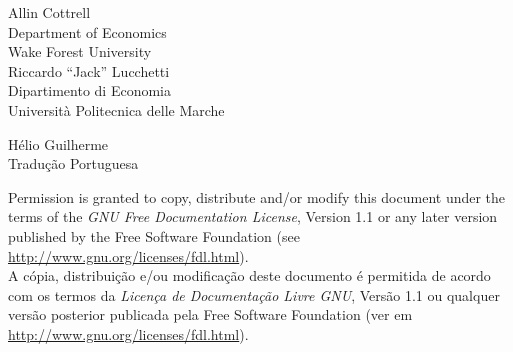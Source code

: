 \documentclass[oneside]{book}
\begin{document}
\VerbatimFootnotes

\setlength{\parindent}{0pt}
\setlength{\parskip}{1ex}



\thispagestyle{empty}

\begin{center}



{\large \sffamily
Allin Cottrell\\
Department of Economics\\
Wake Forest University\\

\vspace{20pt}
Riccardo ``Jack'' Lucchetti\\
Dipartimento di Economia\\
Università Politecnica delle Marche\\

\vspace{20pt}

Hélio Guilherme\\
Tradução Portuguesa\\
\vspace{20pt}

}

\end{center}
\clearpage


\thispagestyle{empty}


\vspace*{2in}

Permission is granted to copy, distribute and/or modify this document
under the terms of the \emph{GNU Free Documentation License}, Version
1.1 or any later version published by the Free Software Foundation
(see \url{http://www.gnu.org/licenses/fdl.html}).\\

\vspace{20pt}
A cópia, distribuição e/ou modificação deste documento é permitida de
acordo com os termos da \emph{Licença de Documentação Livre GNU},
Versão 1.1 ou qualquer versão posterior publicada pela Free Software
Foundation (ver em \url{http://www.gnu.org/licenses/fdl.html}).

\clearpage


\pagestyle{headings}

\tableofcontents

\clearpage
{}







\clearpage

\end{document}
